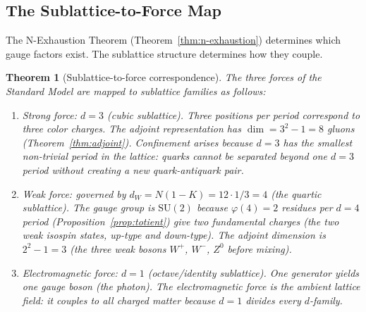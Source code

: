 \documentclass[11pt,a4paper]{article}
\newtheorem{theorem}{Theorem}[section]
\theoremstyle{definition}
\theoremstyle{remark}
\begin{document}
\subsection{The Sublattice-to-Force Map}\label{subsec:force-map}

The N-Exhaustion Theorem (Theorem~\ref{thm:n-exhaustion}) determines which gauge factors exist. The sublattice structure determines how they couple.

\begin{theorem}[Sublattice-to-force correspondence]\label{thm:force-map}
The three forces of the Standard Model are mapped to sublattice families as follows:
\begin{enumerate}[label=\textnormal{(\roman*)},leftmargin=*]
\item \emph{Strong force:} $d = 3$ (cubic sublattice). Three positions per period correspond to three color charges. The adjoint representation has $\dim = 3^{2}-1 = 8$ gluons (Theorem~\ref{thm:adjoint}). Confinement arises because $d=3$ has the smallest non-trivial period in the lattice: quarks cannot be separated beyond one $d=3$ period without creating a new quark-antiquark pair.
\item \emph{Weak force:} governed by $d_{W} = N(1-K) = 12 \cdot 1/3 = 4$ (the quartic sublattice). The gauge group is $\mathrm{SU}(2)$ because $\varphi(4) = 2$ residues per $d=4$ period (Proposition~\ref{prop:totient}) give two fundamental charges (the two weak isospin states, up-type and down-type). The adjoint dimension is $2^{2}-1 = 3$ (the three weak bosons $W^{+}$, $W^{-}$, $Z^{0}$ before mixing).
\item \emph{Electromagnetic force:} $d = 1$ (octave/identity sublattice). One generator yields one gauge boson (the photon). The electromagnetic force is the ambient lattice field: it couples to all charged matter because $d=1$ divides every $d$-family.
\end{enumerate}
\end{theorem}
\end{document}
